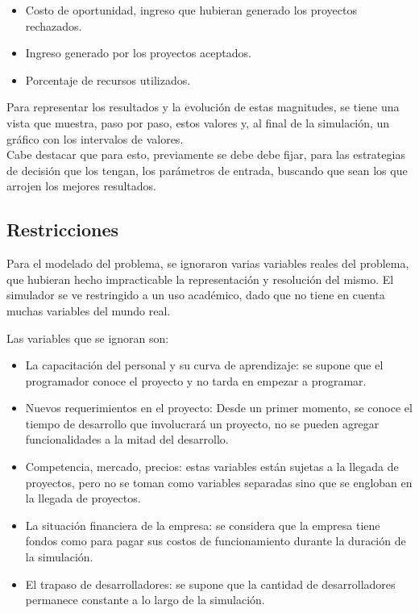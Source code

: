 \begin{itemize}
    \item Costo de oportunidad, ingreso que hubieran generado los proyectos rechazados.
    \item Ingreso generado por los proyectos aceptados.
    \item Porcentaje de recursos utilizados.
\end{itemize}

Para representar los resultados y la evolución de estas magnitudes, se tiene una vista que muestra, paso por paso, estos valores y, al final de la simulación, un
gráfico con los intervalos de valores. \\

Cabe destacar que para esto, previamente se debe debe fijar, para las estrategias de decisión que los tengan, los parámetros de entrada, buscando que sean los
que arrojen los mejores resultados.\\

\subsection{Restricciones}

Para el modelado del problema, se ignoraron varias variables reales del problema, que hubieran hecho impracticable la representación y resolución del mismo. El simulador se ve 
restringido a un uso académico, dado que no tiene en cuenta muchas variables del mundo real.

Las variables que se ignoran son: \\

\begin{itemize}
    \item La capacitación del personal y su curva de aprendizaje: se supone que el programador conoce el proyecto y no tarda en empezar a programar.
    \item Nuevos requerimientos en el proyecto: Desde un primer momento, se conoce el tiempo de desarrollo que involucrará un proyecto, no se pueden agregar 
            funcionalidades a la mitad del desarrollo.
    \item Competencia, mercado, precios: estas variables están sujetas a la llegada de proyectos, pero no se toman como variables separadas sino que se engloban en la 
        llegada de proyectos.
    \item La situación financiera de la empresa: se considera que la empresa tiene fondos como para pagar sus costos de funcionamiento durante la duración de la simulación.
    \item El trapaso de desarrolladores: se supone que la cantidad de desarrolladores permanece constante a lo largo de la simulación.
\end{itemize}


